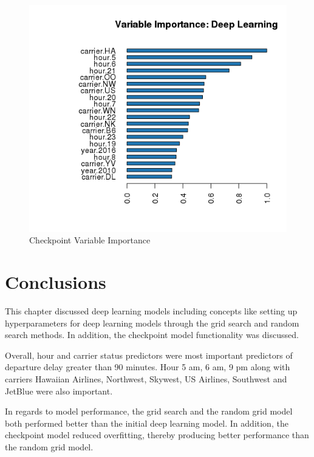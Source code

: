 \documentclass[12pt,twoside]{amherstthesis}
\begin{document}
  \begin{figure}[htbp]
  \centering
  \includegraphics[scale = 0.9,angle = 0]{figure/VarImportCheckpoint.png}
  \caption[Checkpoint Variable Importance]{\normalsize{Checkpoint Variable Importance}}
  \label{fig:Hyarn17}
  \end{figure}
  
  \clearpage 
  
  \section{Conclusions}\label{conclusions}
  
  This chapter discussed deep learning models including concepts like
  setting up hyperparameters for deep learning models through the grid
  search and random search methods. In addition, the checkpoint model
  functionality was discussed.
  
  Overall, hour and carrier status predictors were most important
  predictors of departure delay greater than 90 minutes. Hour 5 am, 6 am,
  9 pm along with carriers Hawaiian Airlines, Northwest, Skywest, US
  Airlines, Southwest and JetBlue were also important.
  
  In regards to model performance, the grid search and the random grid
  model both performed better than the initial deep learning model. In
  addition, the checkpoint model reduced overfitting, thereby producing
  better performance than the random grid model.
  
\end{document}
